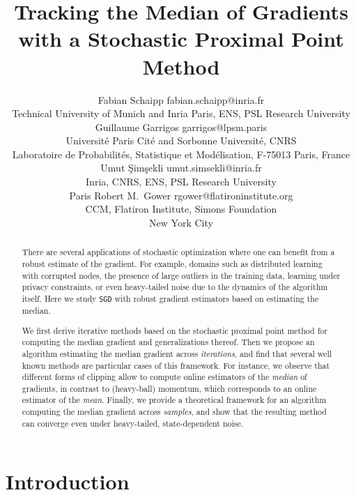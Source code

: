 \documentclass[10pt]{article} %
\title{Tracking the Median of Gradients with a Stochastic Proximal Point Method
}
\author{\name Fabian Schaipp \email fabian.schaipp@inria.fr \\
      \addr Technical University of Munich and Inria Paris, ENS, PSL Research University
      \AND
      \name Guillaume Garrigos \email garrigos@lpsm.paris \\
      \addr Université Paris Cité and Sorbonne Université, CNRS \\
      Laboratoire de Probabilités, Statistique et Modélisation, F-75013 Paris, France
      \AND
      \name Umut \c{S}im\c{s}ekli \email umut.simsekli@inria.fr\\
      \addr Inria, CNRS, ENS, PSL Research University \\
      Paris
      \AND
      \name Robert M.\ Gower \email rgower@flatironinstitute.org\\
      \addr CCM, Flatiron Institute,  Simons Foundation \\
      New York City
      }
\newcommand{\SGD}{\texttt{SGD}}
\begin{document}
\maketitle

\begin{abstract}
There are several applications of stochastic optimization 
where one can benefit from a robust estimate of the gradient. For example, domains such as distributed learning with corrupted nodes, the presence of large outliers in the training data, learning under privacy constraints, or even heavy-tailed noise due to the dynamics of the algorithm itself. Here we study  \SGD{} with robust gradient estimators based on estimating the median.

We first derive iterative methods based on the  stochastic proximal point method for computing the  median gradient and generalizations thereof. 
Then we propose an algorithm  estimating the median gradient across \emph{iterations}, and find that several well known methods are particular cases of this framework.
For instance, we observe that different forms of clipping allow to compute online estimators of the \emph{median} of gradients, in contrast to (heavy-ball) momentum, which corresponds to an online estimator of the \emph{mean}.
Finally, we provide a theoretical framework for an algorithm computing the median gradient across \emph{samples}, and show that the resulting method can converge even under heavy-tailed, state-dependent noise.
\end{abstract}

\section{Introduction}
  
\end{document}
